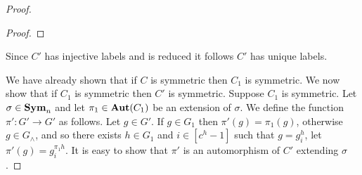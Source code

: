 \documentclass[../paper.tex]{subfiles}
\begin{document}
\begin{proof}
\begin{proof}
  \end{proof}
  
  Since $C'$ has injective labels and is reduced it follows $C'$ has unique
  labels.

  We have already shown that if $C$ is symmetric then $C_1$ is symmetric. We now
  show that if $C_1$ is symmetric then $C'$ is symmetric. Suppose $C_1$ is
  symmetric. Let $\sigma \in \text{\textbf{Sym}}_n$ and let $\pi_1 \in \text{\textbf{Aut}}(C_1)$ be an
  extension of $\sigma$. We define the function $\pi' : G' \rightarrow G'$ as
  follows. Let $g \in G'$. If $g \in G_1$ then $\pi'(g) = \pi_1(g)$, otherwise
  $g \in G_\land$, and so there exists $h \in G_1$ and $i \in [c^h - 1]$ such
  that $g = g^h_i$, let $\pi'(g) = g^{\pi_1 h}_i$. It is easy to show that
  $\pi'$ is an automorphism of $C'$ extending $\sigma$.


\end{proof}
\end{document}
